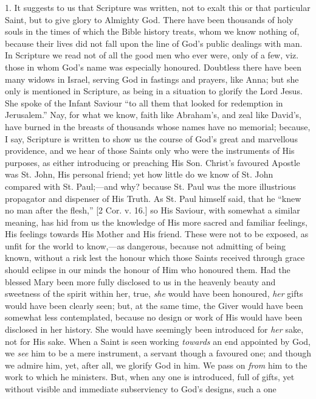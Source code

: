 1. It suggests to us that Scripture was written, not to exalt this or
that particular Saint, but to give glory to Almighty God. There have
been thousands of holy souls in the times of which the Bible history
treats, whom we know nothing of, because their lives did not fall upon
the line of God's public dealings with man. In Scripture we read not of
all the good men who ever were, only of a few, viz. those in whom God's
name was especially honoured. Doubtless there have been many widows in
Israel, serving God in fastings and prayers, like Anna; but she only is
mentioned in Scripture, as being in a situation to glorify the Lord
Jesus. She spoke of the Infant Saviour ``to all them that looked for
redemption in Jerusalem.'' Nay, for what we know, faith like
Abraham's, and zeal like David's, have burned in the breasts of
thousands whose names have no memorial; because, I say, Scripture is
written to show us the course of God's great and marvellous providence,
and we hear of those Saints only who were the instruments of His
purposes, as either introducing or preaching His Son. Christ's favoured
Apostle was St. John, His personal friend; yet how little do we know of
St. John compared with St. Paul;—and why? because St. Paul was the
more illustrious propagator and dispenser of His Truth. As St. Paul
himself said, that he ``knew no man after the flesh,'' [2 Cor.
v. 16.] so His Saviour, with somewhat a similar meaning, has hid from us
the knowledge of His more sacred and familiar feelings, His feelings
towards His Mother and His friend. These were not to be exposed, as
unfit for the world to know,—as dangerous, because not admitting of
being known, without a risk lest the honour which those Saints received
through grace should eclipse in our minds the honour of Him who honoured
them. Had the blessed Mary been more fully disclosed to us in the
heavenly beauty and sweetness of the spirit within her, true, \emph{she}
would have been honoured, \emph{her} gifts would have been clearly seen;
but, at the same time, the Giver would have been somewhat less
contemplated, because no design or work of His would have been disclosed
in her history. She would have seemingly been introduced for \emph{her}
sake, not for His sake. When a Saint is seen working \emph{towards} an
end appointed by God, we \emph{see} him to be a mere instrument, a
servant though a favoured one; and though we admire him, yet, after all,
we glorify God in him. We pass on \emph{from} him to the work to which
he ministers. But, when any one is introduced, full of gifts, yet
without visible and immediate subserviency to God's designs, such a one
